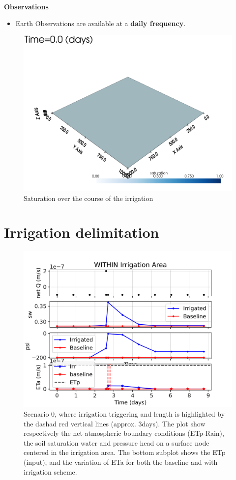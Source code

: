 \documentclass{article}
\begin{document}
\textbf{Observations}

\begin{itemize}
\item Earth Observations are available at a \textbf{daily frequency}.
\end{itemize}

\begin{figure}[!htbp]
\centering
\includegraphics[width=0.75\linewidth]{files/vtksaturation-6351a4b146f09c4ae6b6fcd05adccf86.gif}
\caption*{Saturation over the course of the irrigation}
\end{figure}

\section{Irrigation delimitation}

\begin{figure}[!htbp]
\centering
\includegraphics[width=0.875\linewidth]{files/plot_1d_evol_irrArea-4c0f10ad2fa8517ca684e5052156280c.png}
\caption*{Scenario 0, where irrigation triggering and length is highlighted by the dashad red vertical lines (approx. 3days). The plot show respectively the net atmospheric boundary conditions (ETp-Rain), the soil saturation water and pressure head on a surface node centered in the irrigation area. The bottom subplot shows the ETp (input), and the variation of ETa for both the baseline and with irrigation scheme.}
\end{figure}
\end{document}
